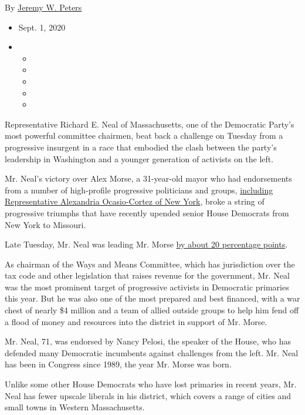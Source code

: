 By \href{https://www.nytimes3xbfgragh.onion/by/jeremy-w-peters}{Jeremy
W. Peters}

\begin{itemize}
\item
  Sept. 1, 2020
\item
  \begin{itemize}
  \item
  \item
  \item
  \item
  \item
  \end{itemize}
\end{itemize}

Representative Richard E. Neal of Massachusetts, one of the Democratic
Party's most powerful committee chairmen, beat back a challenge on
Tuesday from a progressive insurgent in a race that embodied the clash
between the party's leadership in Washington and a younger generation of
activists on the left.

Mr. Neal's victory over Alex Morse, a 31-year-old mayor who had
endorsements from a number of high-profile progressive politicians and
groups,
\href{https://www.nytimes3xbfgragh.onion/2020/08/25/us/politics/alex-morse-richard-neal-aoc.html}{including
Representative Alexandria Ocasio-Cortez of New York}, broke a string of
progressive triumphs that have recently upended senior House Democrats
from New York to Missouri.

Late Tuesday, Mr. Neal was leading Mr. Morse
\href{https://www.nytimes3xbfgragh.onion/interactive/2020/09/01/us/elections/results-massachusetts-house-district-1-democrat-primary-election.html}{by
about 20 percentage points}.

As chairman of the Ways and Means Committee, which has jurisdiction over
the tax code and other legislation that raises revenue for the
government, Mr. Neal was the most prominent target of progressive
activists in Democratic primaries this year. But he was also one of the
most prepared and best financed, with a war chest of nearly \$4 million
and a team of allied outside groups to help him fend off a flood of
money and resources into the district in support of Mr. Morse.

Mr. Neal, 71, was endorsed by Nancy Pelosi, the speaker of the House,
who has defended many Democratic incumbents against challenges from the
left. Mr. Neal has been in Congress since 1989, the year Mr. Morse was
born.

Unlike some other House Democrats who have lost primaries in recent
years, Mr. Neal has fewer upscale liberals in his district, which covers
a range of cities and small towns in Western Massachusetts.

